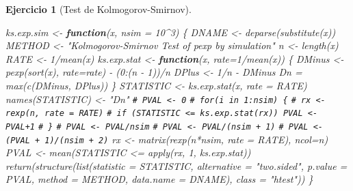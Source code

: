 \documentclass[
]{book}
\newenvironment{Shaded}{\begin{snugshade}}{\end{snugshade}}
\newcommand{\AttributeTok}[1]{\textcolor[rgb]{0.77,0.63,0.00}{#1}}
\newcommand{\CommentTok}[1]{\textcolor[rgb]{0.56,0.35,0.01}{\textit{#1}}}
\newcommand{\ControlFlowTok}[1]{\textcolor[rgb]{0.13,0.29,0.53}{\textbf{#1}}}
\newcommand{\DecValTok}[1]{\textcolor[rgb]{0.00,0.00,0.81}{#1}}
\newcommand{\FunctionTok}[1]{\textcolor[rgb]{0.00,0.00,0.00}{#1}}
\newcommand{\NormalTok}[1]{#1}
\newcommand{\OtherTok}[1]{\textcolor[rgb]{0.56,0.35,0.01}{#1}}
\newcommand{\SpecialCharTok}[1]{\textcolor[rgb]{0.00,0.00,0.00}{#1}}
\newcommand{\StringTok}[1]{\textcolor[rgb]{0.31,0.60,0.02}{#1}}
\theoremstyle{break}
\newtheorem{exercise}{Ejercicio}[chapter]
\theoremstyle{nonumberplain}
\renewcommand{\CommentTok}[1]{\textcolor[rgb]{0.41,0.41,0.41}{\texttt{#1}}}
\begin{document}
\begin{exercise}[Test de Kolmogorov-Smirnov]
\begin{enumerate}
\begin{Shaded}
\begin{Highlighting}[]
\NormalTok{ks.exp.sim }\OtherTok{\textless{}{-}} \ControlFlowTok{function}\NormalTok{(x, }\AttributeTok{nsim =} \DecValTok{10}\SpecialCharTok{\^{}}\DecValTok{3}\NormalTok{) \{}
\NormalTok{  DNAME }\OtherTok{\textless{}{-}} \FunctionTok{deparse}\NormalTok{(}\FunctionTok{substitute}\NormalTok{(x))}
\NormalTok{  METHOD }\OtherTok{\textless{}{-}} \StringTok{"Kolmogorov{-}Smirnov Test of pexp by simulation"} 
\NormalTok{  n }\OtherTok{\textless{}{-}} \FunctionTok{length}\NormalTok{(x)}
\NormalTok{  RATE }\OtherTok{\textless{}{-}} \DecValTok{1}\SpecialCharTok{/}\FunctionTok{mean}\NormalTok{(x)}
\NormalTok{  ks.exp.stat }\OtherTok{\textless{}{-}} \ControlFlowTok{function}\NormalTok{(x, }\AttributeTok{rate=}\DecValTok{1}\SpecialCharTok{/}\FunctionTok{mean}\NormalTok{(x)) \{}
\NormalTok{    DMinus }\OtherTok{\textless{}{-}} \FunctionTok{pexp}\NormalTok{(}\FunctionTok{sort}\NormalTok{(x), }\AttributeTok{rate=}\NormalTok{rate) }\SpecialCharTok{{-}}\NormalTok{ (}\DecValTok{0}\SpecialCharTok{:}\NormalTok{(n }\SpecialCharTok{{-}} \DecValTok{1}\NormalTok{))}\SpecialCharTok{/}\NormalTok{n}
\NormalTok{    DPlus }\OtherTok{\textless{}{-}} \DecValTok{1}\SpecialCharTok{/}\NormalTok{n }\SpecialCharTok{{-}}\NormalTok{ DMinus}
\NormalTok{    Dn }\OtherTok{=} \FunctionTok{max}\NormalTok{(}\FunctionTok{c}\NormalTok{(DMinus, DPlus))}
\NormalTok{  \}  }
\NormalTok{  STATISTIC }\OtherTok{\textless{}{-}} \FunctionTok{ks.exp.stat}\NormalTok{(x, }\AttributeTok{rate =}\NormalTok{ RATE) }
  \FunctionTok{names}\NormalTok{(STATISTIC) }\OtherTok{\textless{}{-}} \StringTok{"Dn"}
  \CommentTok{\# PVAL \textless{}{-} 0}
  \CommentTok{\# for(i in 1:nsim) \{}
  \CommentTok{\#   rx \textless{}{-} rexp(n, rate = RATE)}
  \CommentTok{\#   if (STATISTIC \textless{}= ks.exp.stat(rx)) PVAL \textless{}{-} PVAL+1}
  \CommentTok{\# \}}
  \CommentTok{\# PVAL \textless{}{-} PVAL/nsim}
  \CommentTok{\# PVAL \textless{}{-} PVAL/(nsim + 1)}
  \CommentTok{\# PVAL \textless{}{-} (PVAL + 1)/(nsim + 2)}
\NormalTok{  rx }\OtherTok{\textless{}{-}} \FunctionTok{matrix}\NormalTok{(}\FunctionTok{rexp}\NormalTok{(n}\SpecialCharTok{*}\NormalTok{nsim, }\AttributeTok{rate =}\NormalTok{ RATE), }\AttributeTok{ncol=}\NormalTok{n)}
\NormalTok{  PVAL }\OtherTok{\textless{}{-}} \FunctionTok{mean}\NormalTok{(STATISTIC }\SpecialCharTok{\textless{}=} \FunctionTok{apply}\NormalTok{(rx, }\DecValTok{1}\NormalTok{, ks.exp.stat))}
  \FunctionTok{return}\NormalTok{(}\FunctionTok{structure}\NormalTok{(}\FunctionTok{list}\NormalTok{(}\AttributeTok{statistic =}\NormalTok{ STATISTIC, }\AttributeTok{alternative =} \StringTok{"two.sided"}\NormalTok{, }
                   \AttributeTok{p.value =}\NormalTok{ PVAL, }\AttributeTok{method =}\NormalTok{ METHOD, }\AttributeTok{data.name =}\NormalTok{ DNAME), }
                   \AttributeTok{class =} \StringTok{"htest"}\NormalTok{))}
\NormalTok{\}}
\end{Highlighting}
\end{Shaded}


\end{enumerate}
\end{exercise}
\end{document}
